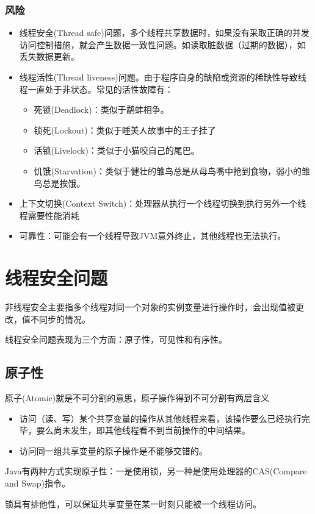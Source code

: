\documentclass[a4paper]{report}
\begin{document}
\subsection{风险}
\begin{itemize}
  \item 线程安全(Thread safe)问题，多个线程共享数据时，如果没有采取正确的并发访问控制措施，就会产生数据一致性问题。如读取脏数据（过期的数据），如丢失数据更新。
  \item 线程活性(Thread liveness)问题。由于程序自身的缺陷或资源的稀缺性导致线程一直处于非状态。常见的活性故障有：
      \begin{itemize}
        \item 死锁(Deadlock)：类似于鹬蚌相争。
        \item 锁死(Lockout)：类似于睡美人故事中的王子挂了
        \item 活锁(Livelock)：类似于小猫咬自己的尾巴。
        \item 饥饿(Starvation)：类似于健壮的雏鸟总是从母鸟嘴中抢到食物，弱小的雏鸟总是挨饿。
      \end{itemize}
  \item 上下文切换(Context Switch)：处理器从执行一个线程切换到执行另外一个线程需要性能消耗
  \item 可靠性：可能会有一个线程导致JVM意外终止，其他线程也无法执行。
\end{itemize}
\chapter{线程安全问题}
非线程安全主要指多个线程对同一个对象的实例变量进行操作时，会出现值被更改，值不同步的情况。

线程安全问题表现为三个方面：原子性，可见性和有序性。
\section{原子性}
原子(Atomic)就是不可分割的意思，原子操作得到不可分割有两层含义
\begin{itemize}
  \item 访问（读、写）某个共享变量的操作从其他线程来看，该操作要么已经执行完毕，要么尚未发生，即其他线程看不到当前操作的中间结果。
  \item 访问同一组共享变量的原子操作是不能够交错的。
\end{itemize}

Java有两种方式实现原子性：一是使用锁，另一种是使用处理器的CAS(Compare and Swap)指令。

锁具有排他性，可以保证共享变量在某一时刻只能被一个线程访问。
\end{document}
